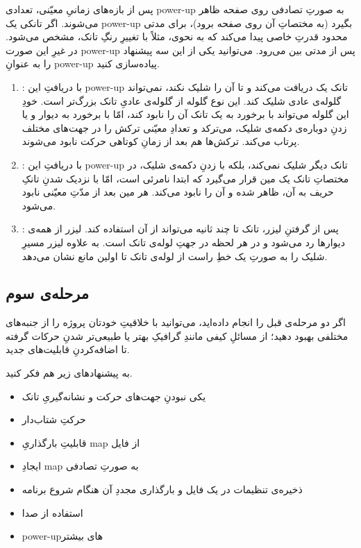 \documentclass[a4paper,12pt]{paper}
\begin{document}
پس از بازه‌های زمانیِ معیّنی، ‌‌تعدادی {\en power-up} به صورتِ تصادفی روی صفحه ظاهر می‌شوند. اگر تانکی یک {\en power-up} بگیرد (به مختصاتِ آن روی صفحه برود)، برای مدتی محدود قدرتِ خاصی پیدا می‌کند که به نحوی، مثلاً با تغییرِ رنگِ تانک، مشخص می‌شود. در غیرِ این صورت {\en power-up} پس از مدتی بین می‌رود. می‌توانید یکی از این سه پیشنهاد را به عنوانِ {\en power-up} پیاده‌سازی کنید.
\begin{enumerate}
	\item {}:
	با دریافتِ این {\en power-up} تانک یک  دریافت می‌کند و تا آن را شلیک نکند، نمی‌تواند گلوله‌ی عادی شلیک کند. این نوع گلوله از گلوله‌ی عادیِ تانک بزرگ‌تر است. خودِ این گلوله می‌تواند با برخورد به یک تانک آن را نابود کند، امّا با برخورد به دیوار و یا زدنِ دوباره‌ی دکمه‌ی شلیک،  می‌ترکد و تعدادِ معیّنی ترکش را در جهت‌های مختلف پرتاب می‌کند. ترکش‌ها هم بعد از زمانِ کوتاهی حرکت نابود می‌شوند.
	\item {}:
	با دریافتِ این {\en power-up} تانک دیگر شلیک نمی‌کند، بلکه با زدنِ دکمه‌ی شلیک، در مختصاتِ تانک یک مین قرار می‌گیرد که ابتدا نامرئی است، امّا با نزدیک شدنِ تانکِ حریف به آن، ظاهر شده و آن را نابود می‌کند. هر مین بعد از مدّتِ معیّنی نابود می‌شود.
	\item {}:
	پس از گرفتنِ لیزر، تانک تا چند ثانیه می‌تواند از آن استفاده کند. لیزر از همه‌ی دیوارها رد می‌شود و در هر لحظه در جهتِ لوله‌ی تانک است. به علاوه لیزر مسیرِ شلیک را به صورتِ یک خطِ راست از لوله‌ی تانک تا اولین مانع نشان می‌دهد.
\end{enumerate}

\subsection*{مرحله‌ی سوم}
اگر دو مرحله‌ی قبل را انجام داده‌اید، می‌توانید با خلاقیتِ خودتان پروژه را از جنبه‌های مختلفی بهبود دهید؛ از مسائلِ کیفی مانندِ گرافیکِ بهتر یا طبیعی‌تر شدنِ حرکات گرفته تا اضافه‌کردنِ قابلیت‌های جدید.

به پیشنهاد‌های زیر هم فکر کنید.
\begin{itemize}
	\item
	یکی نبودنِ جهت‌های حرکت و نشانه‌گیریِ تانک
	\item
	حرکتِ شتاب‌دار
	\item
	قابلیتِ بارگذاریِ {\en map} از فایل
	\item
	ایجادِ {\en map} به صورتِ تصادفی
	\item
	ذخیره‌ی تنظیمات در یک فایل و بارگذاری مجددِ آن هنگام شروع برنامه
	\item
	استفاده از صدا
	\item
{\en power-up}های بیشتر
\end{itemize}
\end{document}
